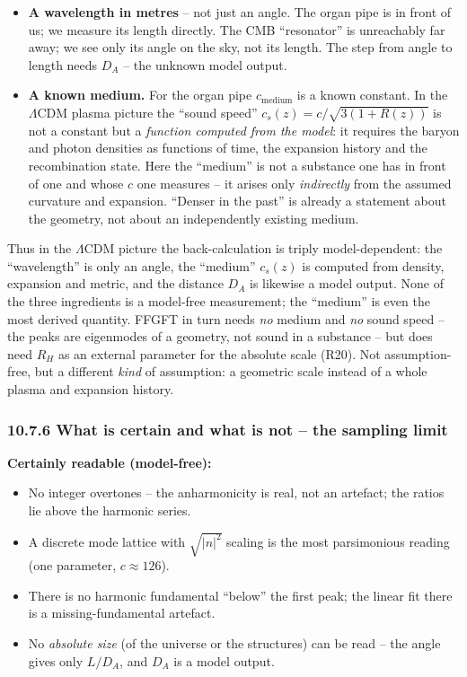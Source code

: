 \begin{itemize}
  \item \textbf{A wavelength in metres} -- not just an angle. The organ
        pipe is in front of us; we measure its length directly. The
        CMB ``resonator'' is unreachably far away; we see only its
        angle on the sky, not its length. The step from angle to length
        needs $D_A$ -- the unknown model output.
  \item \textbf{A known medium.} For the organ pipe $c_\mathrm{medium}$
        is a known constant. In the $\Lambda$CDM plasma picture the
        ``sound speed'' $c_s(z) = c/\sqrt{3(1+R(z))}$ is not a constant
        but a \emph{function computed from the model}: it requires the
        baryon and photon densities as functions of time, the expansion
        history and the recombination state. Here the ``medium'' is not
        a substance one has in front of one and whose $c$ one measures
        -- it arises only \emph{indirectly} from the assumed curvature
        and expansion. ``Denser in the past'' is already a statement
        about the geometry, not about an independently existing medium.
\end{itemize}

Thus in the $\Lambda$CDM picture the back-calculation is triply
model-dependent: the ``wavelength'' is only an angle, the ``medium''
$c_s(z)$ is computed from density, expansion and metric, and the
distance $D_A$ is likewise a model output. None of the three
ingredients is a model-free measurement; the ``medium'' is even the
most derived quantity. FFGFT in turn needs \emph{no} medium and
\emph{no} sound speed -- the peaks are eigenmodes of a geometry, not
sound in a substance -- but does need $R_H$ as an external parameter
for the absolute scale (R20). Not assumption-free, but a different
\emph{kind} of assumption: a geometric scale instead of a whole plasma
and expansion history.

\subsubsection*{10.7.6 What is certain and what is not -- the sampling limit}

\textbf{Certainly readable (model-free):}
\begin{itemize}
  \item No integer overtones -- the anharmonicity is real, not an
        artefact; the ratios lie above the harmonic series.
  \item A discrete mode lattice with $\sqrt{|n|^2}$ scaling is the
        most parsimonious reading (one parameter, $c \approx 126$).
  \item There is no harmonic fundamental ``below'' the first peak;
        the linear fit there is a missing-fundamental artefact.
  \item No \emph{absolute size} (of the universe or the structures)
        can be read -- the angle gives only $L/D_A$, and $D_A$ is a
        model output.
\end{itemize}

